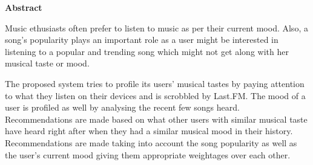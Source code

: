 \cleardoublepage

\begin{center}
	\huge{\textbf{Abstract}}
\end{center}

Music ethusiasts often prefer to listen to music as per their current mood. Also, a song's popularity plays an important role as a user might be interested in listening to a popular and trending song which might not get along with her musical taste or mood.

The proposed system tries to profile its users' musical tastes by paying attention to what they listen on their devices and is scrobbled by Last.FM. The mood of a user is profiled as well by analysing the recent few songs heard. Recommendations are made based on what other users with similar musical taste have heard right after when they had a similar musical mood in their history.  Recommendations are made taking into account the song popularity as well as the user's current mood giving them appropriate weightages over each other.